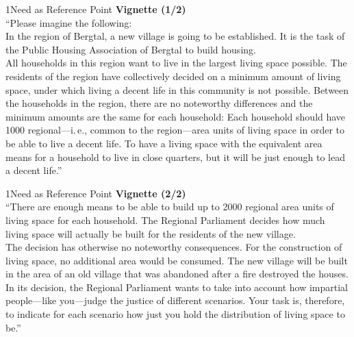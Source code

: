 \documentclass[xcolor=table,9pt,aspectratio=169]{beamer}
\begin{document}
\begin{frame}{\vspace*{10mm}1\hspace*{1em}Need as Reference Point}
\textbf{Vignette (1/2)}\\
\medskip
\enquote{Please imagine the following:\\
\medskip
In the region of Bergtal, a new village is going to be established.
It is the task of the Public Housing Association of Bergtal to build housing.\\
\medskip
All households in this region want to live in the largest living space possible.
\textcolor{blue1}{The residents of the region have collectively decided on a minimum amount of living space, under which living a decent life in this community is not possible.}
Between the households in the region, there are no noteworthy differences \textcolor{blue1}{and the minimum amounts are the same for each household:
Each household should have 1000 regional---i.\,e., common to the region---area units of living space in order to be able to live a decent life.
To have a living space with the equivalent area means for a household to live in close quarters, but it will be just enough to lead a decent life}.}
\end{frame}


\begin{frame}{\vspace*{10mm}1\hspace*{1em}Need as Reference Point}
\textbf{Vignette (2/2)}\\
\medskip
\enquote{There are enough means to be able to build up to 2000 regional area units of living space for each household.
The Regional Parliament decides how much living space will actually be built for the residents of the new village.\\
\medskip
The decision has otherwise no noteworthy consequences.
For the construction of living space, no additional area would be consumed.
The new village will be built in the area of an old village that was abandoned after a fire destroyed the houses.\\
\medskip
In its decision, the Regional Parliament wants to take into account how impartial people---like you---judge the justice of different scenarios.
Your task is, therefore, to indicate for each scenario how just you hold the distribution of living space to be.}
\end{frame}
\end{document}
